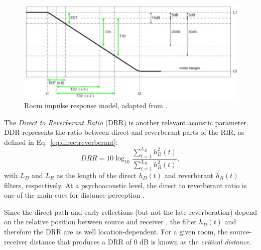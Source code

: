 \begin{figure}[htbp]
	\begin{center}
	\includegraphics[width=\textwidth]{Figures/Introduction/edt.png}
	\caption{Room impulse response model, adapted from \cite{avinfo}.}
	\label{fig:reverberationtimes}
	\end{center}
\end{figure}


The \textit{Direct to Reverberant Ratio} (DRR) is another relevant acoustic parameter. DDR represents the ratio between direct and reverberant parts of the RIR, as defined in Eq.~\ref{eq:directreverberant}:
\begin{equation}
	DRR = 10 \log_{10} \frac{ \sum_{t=1}^{L_D} h^2_D(t) }{ \sum_{t=1}^{L_R} h^2_R(t)},
\end{equation}
with $L_D$ and $L_R$ as the length of the direct $h_D(t)$ and reverberant $h_R(t)$ filters, respectively.  
At a psychoacoustic level, the direct to reverberant ratio is one of the main cues for distance perception \cite{begault20003}. 

Since the direct path and early reflections (but not the late reverberation) depend on the relative position between source and receiver , the filter $h_D(t)$ and therefore the DRR are as well location-dependent. For a given room, the source-receiver distance that produces a DRR of 0 dB is known as the \textit{critical distance}. 


